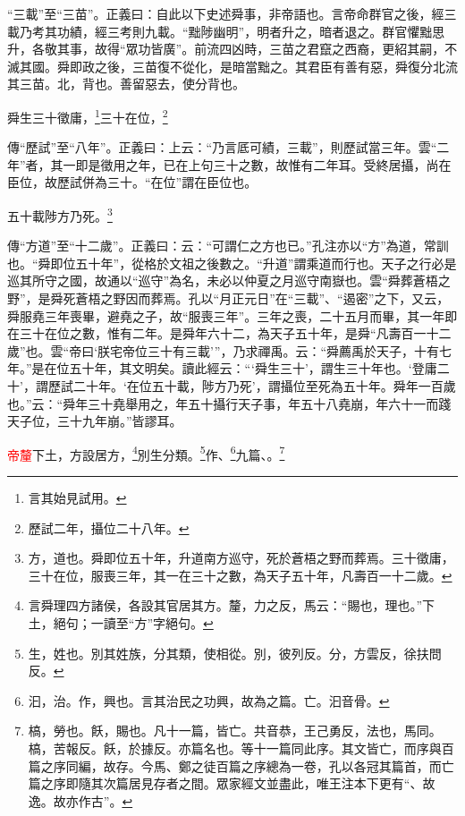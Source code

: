 {\noindent\shu{}\fzkt “三載”至“三苗”。正義曰：自此以下史述舜事，非帝語也。言帝命群官之後，經三載乃考其功績，經三考則九載。“黜陟幽明”，明者升之，暗者退之。群官懼黜思升，各敬其事，故得“眾功皆廣”。前流四凶時，三苗之君竄之西裔，更紹其嗣，不滅其國。舜即政之後，三苗復不從化，是暗當黜之。其君臣有善有惡，舜復分北流其三苗。北，背也。善留惡去，使分背也。 \par}

舜生三十徵庸，\footnote{言其始見試用。}三十在位，\footnote{歷試二年，攝位二十八年。}

{\noindent\zhuan{}\fzbyks 傳“歷試”至“八年”。正義曰：上云：“乃言厎可績，三載”，則歷試當三年。雲“二年”者，其一即是徵用之年，已在上句三十之數，故惟有二年耳。受終居攝，尚在臣位，故歷試併為三十。“在位”謂在臣位也。 \par}

五十載陟方乃死。\footnote{方，道也。舜即位五十年，升道南方巡守，死於蒼梧之野而葬焉。三十徵庸，三十在位，服喪三年，其一在三十之數，為天子五十年，凡壽百一十二歲。}

{\noindent\zhuan{}\fzbyks 傳“方道”至“十二歲”。正義曰：云：“可謂仁之方也已。”孔注亦以“方”為道，常訓也。“舜即位五十年”，從格於文祖之後數之。“升道”謂乘道而行也。天子之行必是巡其所守之國，故通以“巡守”為名，未必以仲夏之月巡守南嶽也。雲“舜葬蒼梧之野”，是舜死蒼梧之野因而葬焉。孔以“月正元日”在“三載”、“遏密”之下，又云，舜服堯三年喪畢，避堯之子，故“服喪三年”。三年之喪，二十五月而畢，其一年即在三十在位之數，惟有二年。是舜年六十二，為天子五十年，是舜“凡壽百一十二歲”也。雲“帝曰‘朕宅帝位三十有三載’”，乃求禪禹。云：“舜薦禹於天子，十有七年。”是在位五十年，其文明矣。讀此經云：“‘舜生三十’，謂生三十年也。‘登庸二十’，謂歷試二十年。‘在位五十載，陟方乃死’，謂攝位至死為五十年。舜年一百歲也。”云：“舜年三十堯舉用之，年五十攝行天子事，年五十八堯崩，年六十一而踐天子位，三十九年崩。”皆謬耳。 \par}

\textcolor{red}{帝釐}下土，方設居方，\footnote{言舜理四方諸侯，各設其官居其方。釐，力之反，馬云：“賜也，理也。”下土，絕句；一讀至“方”字絕句。}別生分類。\footnote{生，姓也。別其姓族，分其類，使相從。別，彼列反。分，方雲反，徐扶問反。}作、\footnote{汩，治。作，興也。言其治民之功興，故為之篇。亡。汩音骨。}九篇、\CJKunderwave{\textcolor{red}{槁飫}}。\footnote{槁，勞也。飫，賜也。凡十一篇，皆亡。共音恭，王己勇反，法也，馬同。槁，苦報反。飫，於據反。亦篇名也。等十一篇同此序。其文皆亡，而序與百篇之序同編，故存。今馬、鄭之徒百篇之序總為一卷，孔以各冠其篇首，而亡篇之序即隨其次篇居見存者之間。眾家經文並盡此，唯王注本下更有“、故逸。故亦作古”。}

